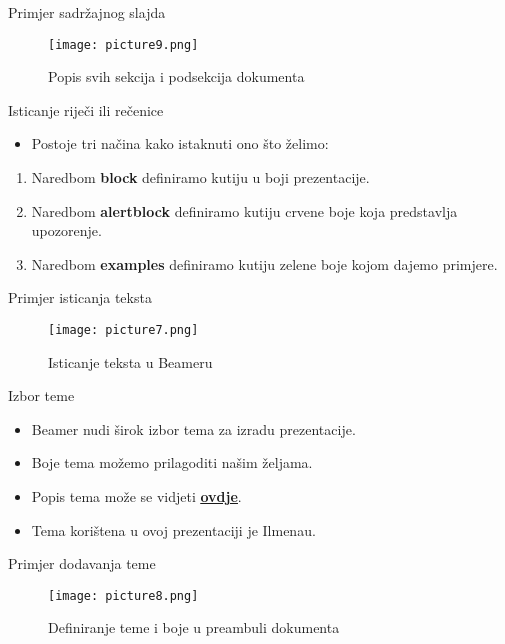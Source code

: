 \documentclass{beamer}
\begin{document}
\begin{frame}{Primjer sadržajnog slajda}
	\begin{figure}
		\texttt{[image: picture9.png]} 
		\caption{Popis svih sekcija i podsekcija dokumenta}
	\end{figure}
\end{frame}

\begin{frame}{Isticanje riječi ili rečenice}
	\begin{itemize}
		\item Postoje tri načina kako istaknuti ono što želimo:
	\end{itemize}
	\begin{enumerate}
		\item Naredbom \textbf{block} definiramo kutiju u boji prezentacije.
		\item Naredbom \textbf{alertblock} definiramo kutiju crvene boje koja predstavlja upozorenje.
		\item Naredbom \textbf{examples} definiramo kutiju zelene boje kojom dajemo primjere.
	\end{enumerate}
\end{frame}

\begin{frame}{Primjer isticanja teksta}
	 	\begin{figure}
		\texttt{[image: picture7.png]} 
		\caption{Isticanje teksta u Beameru}
	\end{figure}
\end{frame}

\begin{frame}{Izbor teme}
	\begin{itemize}
		\item Beamer nudi širok izbor tema za izradu prezentacije.
		\item Boje tema možemo prilagoditi našim željama.
		\item Popis tema može se vidjeti \hyperlink{http://deic.uab.es/~iblanes/beamer_gallery/index_by_theme.html}{\underline{\textbf{ovdje}}}.
		\item Tema korištena u ovoj prezentaciji je Ilmenau.
	\end{itemize}
\end{frame}

\begin{frame}{Primjer dodavanja teme}
		 \begin{figure}
		\texttt{[image: picture8.png]} 
		\caption{Definiranje teme i boje u preambuli dokumenta}
	\end{figure}
\end{frame}
\end{document}
